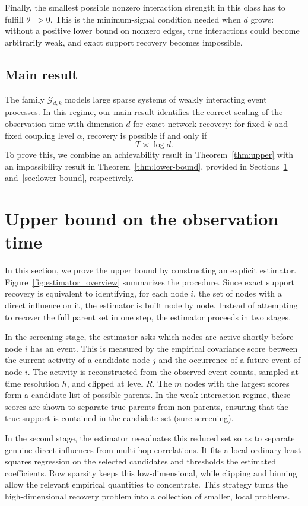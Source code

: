 \documentclass{article}
\newcommand{\thetalo}{\theta_-}
\begin{document}
Finally, the smallest possible nonzero interaction strength in this class has to fulfill $\thetalo>0$.
This is the minimum-signal condition needed when $d$ grows: without a positive lower bound on nonzero edges, true interactions could become arbitrarily weak, and exact support recovery becomes impossible.


\subsection{Main result}

The family $\mathcal G_{d,k}$ models large sparse systems of weakly interacting event processes. 
In this regime, our main result identifies the correct scaling of the observation time with dimension $d$ for exact network recovery: for fixed $k$ and fixed coupling level $\alpha$, recovery is possible if and only if
\[
    T \asymp \log d.
\]
To prove this, we combine an achievability result in Theorem~\ref{thm:upper} with an impossibility result in Theorem~\ref{thm:lower-bound}, provided  in Sections~\ref{sec:upper-bound} and~\ref{sec:lower-bound}, respectively.

\section{Upper bound on the observation time}\label{sec:upper-bound}

In this section, we prove the upper bound by constructing an explicit estimator. 
Figure~\ref{fig:estimator_overview} summarizes the procedure.
Since exact support recovery is equivalent to identifying, for each node $i$, the set of nodes with a direct influence on it, the estimator is built node by node. Instead of attempting to recover the full parent set in one step, the estimator proceeds in two stages.

In the screening stage, the estimator asks which nodes are active shortly before node $i$ has an event. 
This is measured by the empirical covariance score between the current activity of a candidate node $j$ and the occurrence of a future event of node $i$.
The activity is reconstructed from the observed event counts, sampled at time resolution $h$, and clipped at level $R$.
The $m$ nodes with the largest scores form a candidate list of possible parents. 
In the weak-interaction regime, these scores are shown to separate true parents from non-parents, ensuring that the true support is contained in the candidate set (sure screening). 

In the second stage, the estimator reevaluates this reduced set so as to separate genuine direct influences from multi-hop correlations.
It fits a local ordinary least-squares regression on the selected candidates and thresholds the estimated coefficients.
Row sparsity keeps this low-dimensional, while clipping and binning allow the relevant empirical quantities to concentrate.
This strategy turns the high-dimensional recovery problem into a collection of smaller, local problems.
\end{document}
